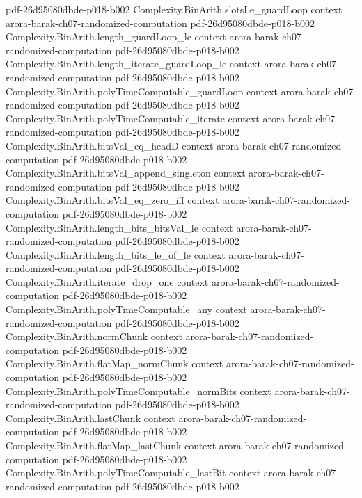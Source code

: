 \begin{theorem}
  {pdf-26d95080dbde-p018-b002}
\proofstep
  {Complexity.BinArith.slotsLe_guardLoop}
  {context}
  {arora-barak-ch07-randomized-computation}
  {pdf-26d95080dbde-p018-b002}
\proofstep
  {Complexity.BinArith.length_guardLoop_le}
  {context}
  {arora-barak-ch07-randomized-computation}
  {pdf-26d95080dbde-p018-b002}
\proofstep
  {Complexity.BinArith.length_iterate_guardLoop_le}
  {context}
  {arora-barak-ch07-randomized-computation}
  {pdf-26d95080dbde-p018-b002}
\proofstep
  {Complexity.BinArith.polyTimeComputable_guardLoop}
  {context}
  {arora-barak-ch07-randomized-computation}
  {pdf-26d95080dbde-p018-b002}
\proofstep
  {Complexity.BinArith.polyTimeComputable_iterate}
  {context}
  {arora-barak-ch07-randomized-computation}
  {pdf-26d95080dbde-p018-b002}
\proofstep
  {Complexity.BinArith.bitsVal_eq_headD}
  {context}
  {arora-barak-ch07-randomized-computation}
  {pdf-26d95080dbde-p018-b002}
\proofstep
  {Complexity.BinArith.bitsVal_append_singleton}
  {context}
  {arora-barak-ch07-randomized-computation}
  {pdf-26d95080dbde-p018-b002}
\proofstep
  {Complexity.BinArith.bitsVal_eq_zero_iff}
  {context}
  {arora-barak-ch07-randomized-computation}
  {pdf-26d95080dbde-p018-b002}
\proofstep
  {Complexity.BinArith.length_bits_bitsVal_le}
  {context}
  {arora-barak-ch07-randomized-computation}
  {pdf-26d95080dbde-p018-b002}
\proofstep
  {Complexity.BinArith.length_bits_le_of_le}
  {context}
  {arora-barak-ch07-randomized-computation}
  {pdf-26d95080dbde-p018-b002}
\proofstep
  {Complexity.BinArith.iterate_drop_one}
  {context}
  {arora-barak-ch07-randomized-computation}
  {pdf-26d95080dbde-p018-b002}
\proofstep
  {Complexity.BinArith.polyTimeComputable_any}
  {context}
  {arora-barak-ch07-randomized-computation}
  {pdf-26d95080dbde-p018-b002}
\proofstep
  {Complexity.BinArith.normChunk}
  {context}
  {arora-barak-ch07-randomized-computation}
  {pdf-26d95080dbde-p018-b002}
\proofstep
  {Complexity.BinArith.flatMap_normChunk}
  {context}
  {arora-barak-ch07-randomized-computation}
  {pdf-26d95080dbde-p018-b002}
\proofstep
  {Complexity.BinArith.polyTimeComputable_normBits}
  {context}
  {arora-barak-ch07-randomized-computation}
  {pdf-26d95080dbde-p018-b002}
\proofstep
  {Complexity.BinArith.lastChunk}
  {context}
  {arora-barak-ch07-randomized-computation}
  {pdf-26d95080dbde-p018-b002}
\proofstep
  {Complexity.BinArith.flatMap_lastChunk}
  {context}
  {arora-barak-ch07-randomized-computation}
  {pdf-26d95080dbde-p018-b002}
\proofstep
  {Complexity.BinArith.polyTimeComputable_lastBit}
  {context}
  {arora-barak-ch07-randomized-computation}
  {pdf-26d95080dbde-p018-b002}

\end{theorem}
